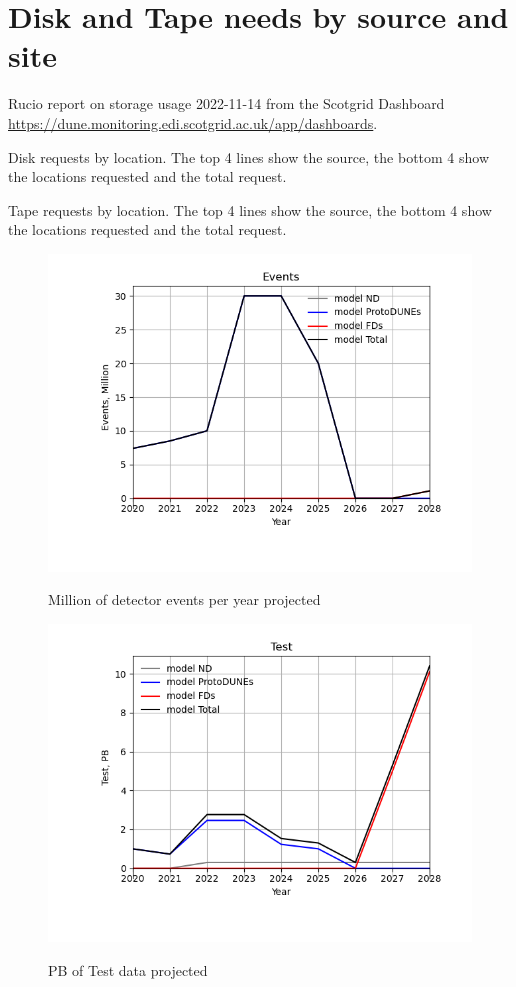 \documentclass[12pt,landscape]{article}
\begin{document}
\section{Disk and Tape needs by source and site}
\begin{table}[h]
 \centering{}
 \label{Cumulative-Tape}
\caption{Rucio report on storage usage 2022-11-14 from the Scotgrid Dashboard \href{https://dune.monitoring.edi.scotgrid.ac.uk/app/dashboards}{https://dune.monitoring.edi.scotgrid.ac.uk/app/dashboards}.}
 \end{table}
\begin{table}[h]
\centering{}\label{Cumulative-Disk
}
\caption{Disk requests by location. The top 4 lines show the source, the bottom 4 show the locations requested and the total request.}
\end{table}
\begin{table}[h]
\centering{}\label{Cumulative-Tape
}
\caption{Tape requests by location. The top 4 lines show the source, the bottom 4 show the locations requested and the total request.}
\end{table}
\begin{figure}[ht]
\centering\includegraphics[height=0.4\textwidth]{report/Parameters_2022-11-07-2028-Events.png}\label{Events}
\caption{Million of detector events per year projected}
\end{figure}
\begin{figure}[ht]
\centering\includegraphics[height=0.4\textwidth]{report/Parameters_2022-11-07-2028-Test.png}\label{Test}
\caption{PB of Test data projected}
\end{figure}
\end{document}
